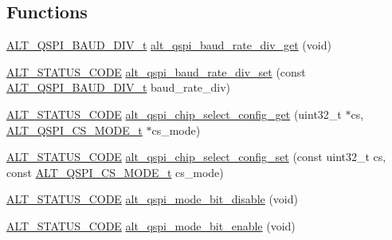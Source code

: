 \subsection*{Functions}
\begin{DoxyCompactItemize}
\item 
\mbox{\hyperlink{group__ALT__QSPI__DEV__CFG_ga5a183c627f4dc5f1469a227c748b01ec}{A\+L\+T\+\_\+\+Q\+S\+P\+I\+\_\+\+B\+A\+U\+D\+\_\+\+D\+I\+V\+\_\+t}} \mbox{\hyperlink{group__ALT__QSPI__DEV__CFG_ga49ab5eb9e2067a6724b0bd41162eb359}{alt\+\_\+qspi\+\_\+baud\+\_\+rate\+\_\+div\+\_\+get}} (void)
\item 
\mbox{\hyperlink{hwlib_8h_abdb0d369f069723ca55d6c94bcaaaa12}{A\+L\+T\+\_\+\+S\+T\+A\+T\+U\+S\+\_\+\+C\+O\+DE}} \mbox{\hyperlink{group__ALT__QSPI__DEV__CFG_ga964033a111f879c5ddfab32cfec0b5f6}{alt\+\_\+qspi\+\_\+baud\+\_\+rate\+\_\+div\+\_\+set}} (const \mbox{\hyperlink{group__ALT__QSPI__DEV__CFG_ga5a183c627f4dc5f1469a227c748b01ec}{A\+L\+T\+\_\+\+Q\+S\+P\+I\+\_\+\+B\+A\+U\+D\+\_\+\+D\+I\+V\+\_\+t}} baud\+\_\+rate\+\_\+div)
\item 
\mbox{\hyperlink{hwlib_8h_abdb0d369f069723ca55d6c94bcaaaa12}{A\+L\+T\+\_\+\+S\+T\+A\+T\+U\+S\+\_\+\+C\+O\+DE}} \mbox{\hyperlink{group__ALT__QSPI__DEV__CFG_ga4ecb1d5a8109c664aea8b1dc950dd9e4}{alt\+\_\+qspi\+\_\+chip\+\_\+select\+\_\+config\+\_\+get}} (uint32\+\_\+t $\ast$cs, \mbox{\hyperlink{group__ALT__QSPI__DEV__CFG_gaffe96455cbf44fb3adb844c576c045fe}{A\+L\+T\+\_\+\+Q\+S\+P\+I\+\_\+\+C\+S\+\_\+\+M\+O\+D\+E\+\_\+t}} $\ast$cs\+\_\+mode)
\item 
\mbox{\hyperlink{hwlib_8h_abdb0d369f069723ca55d6c94bcaaaa12}{A\+L\+T\+\_\+\+S\+T\+A\+T\+U\+S\+\_\+\+C\+O\+DE}} \mbox{\hyperlink{group__ALT__QSPI__DEV__CFG_ga26f3a0e03cc1bca6f76c1fb6c1195864}{alt\+\_\+qspi\+\_\+chip\+\_\+select\+\_\+config\+\_\+set}} (const uint32\+\_\+t cs, const \mbox{\hyperlink{group__ALT__QSPI__DEV__CFG_gaffe96455cbf44fb3adb844c576c045fe}{A\+L\+T\+\_\+\+Q\+S\+P\+I\+\_\+\+C\+S\+\_\+\+M\+O\+D\+E\+\_\+t}} cs\+\_\+mode)
\item 
\mbox{\hyperlink{hwlib_8h_abdb0d369f069723ca55d6c94bcaaaa12}{A\+L\+T\+\_\+\+S\+T\+A\+T\+U\+S\+\_\+\+C\+O\+DE}} \mbox{\hyperlink{group__ALT__QSPI__DEV__CFG_gab73dc90410cd0b88c97e836b68cfcd11}{alt\+\_\+qspi\+\_\+mode\+\_\+bit\+\_\+disable}} (void)
\item 
\mbox{\hyperlink{hwlib_8h_abdb0d369f069723ca55d6c94bcaaaa12}{A\+L\+T\+\_\+\+S\+T\+A\+T\+U\+S\+\_\+\+C\+O\+DE}} \mbox{\hyperlink{group__ALT__QSPI__DEV__CFG_gac4eb6995a032a293aa3ff09739344712}{alt\+\_\+qspi\+\_\+mode\+\_\+bit\+\_\+enable}} (void)

\end{DoxyCompactItemize}
